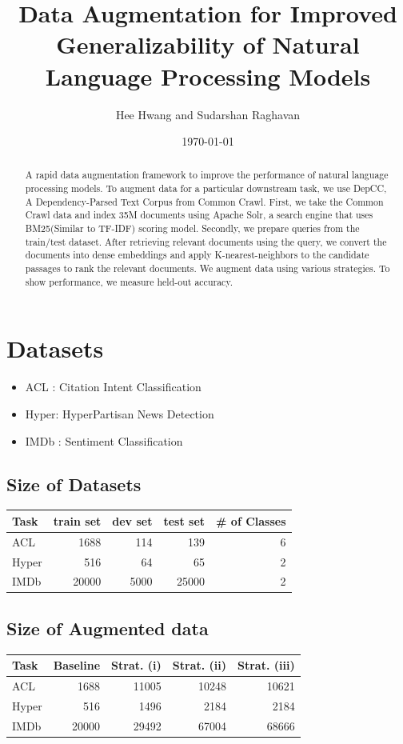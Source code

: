 \documentclass[twocolumn]{article}
\author{Hee Hwang and Sudarshan Raghavan}
\date{\today}
\title{Data Augmentation for Improved Generalizability of Natural Language Processing Models}
\begin{document}
\maketitle
\begin{abstract}
A rapid data augmentation framework to improve the performance of natural language processing models. To augment data for a particular downstream task, we use DepCC, A Dependency-Parsed Text Corpus from Common Crawl. First, we take the Common Crawl data and index 35M documents using Apache Solr, a search engine that uses BM25(Similar to TF-IDF) scoring model. Secondly, we prepare queries from the train/test dataset. After retrieving relevant documents using the query, we convert the documents into dense embeddings and apply  K-nearest-neighbors to the candidate passages to rank the relevant documents. We augment data using various strategies. To show performance, we measure held-out accuracy.
\end{abstract}

\section{Datasets}
\label{sec:org8461f64}
\begin{itemize}
\item ACL  : Citation Intent Classification
\item Hyper: HyperPartisan News Detection
\item IMDb : Sentiment Classification
\end{itemize}
\subsection{Size of Datasets}
\label{sec:org295db5f}
\begin{center}
\begin{tabular}{lrrrr}
\hline
Task & train set & dev set & test set & \# of Classes\\
\hline
ACL & 1688 & 114 & 139 & 6\\
\hline
Hyper & 516 & 64 & 65 & 2\\
\hline
IMDb & 20000 & 5000 & 25000 & 2\\
\hline
\end{tabular}
\end{center}

\subsection{Size of Augmented data}
\label{sec:org484f24b}
\begin{center}
\begin{tabular}{lrrrr}
\hline
Task & Baseline & Strat. (i) & Strat. (ii) & Strat. (iii)\\
\hline
ACL & 1688 & 11005 & 10248 & 10621\\
\hline
Hyper & 516 & 1496 & 2184 & 2184\\
\hline
IMDb & 20000 & 29492 & 67004 & 68666\\
\hline
\end{tabular}
\end{center}
\end{document}
